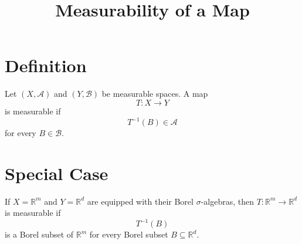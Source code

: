 \documentclass[11pt]{article}
\title{Measurability of a Map}
\author{}
\date{}
\begin{document}
\maketitle

\section*{Definition}

Let $(X,\mathcal A)$ and $(Y,\mathcal B)$ be measurable spaces. A map
\[
T : X \to Y
\]
is measurable if
\[
T^{-1}(B) \in \mathcal A
\]
for every $B \in \mathcal B$.

\section*{Special Case}

If $X=\mathbb R^m$ and $Y=\mathbb R^d$ are equipped with their Borel
$\sigma$-algebras, then $T:\mathbb R^m \to \mathbb R^d$ is measurable if
\[
T^{-1}(B)
\]
is a Borel subset of $\mathbb R^m$ for every Borel subset
$B \subseteq \mathbb R^d$.
\end{document}
